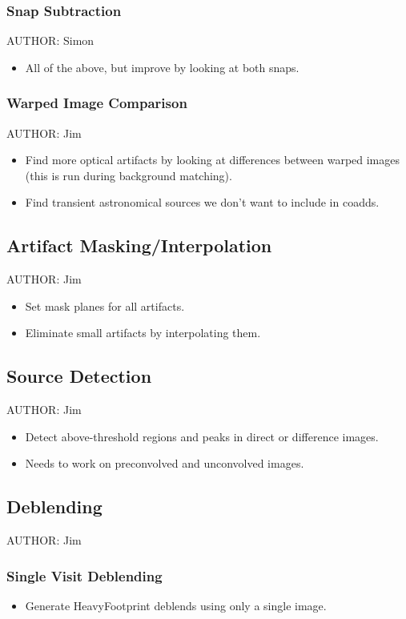 \subsubsection{Snap Subtraction}
AUTHOR: Simon
\begin{itemize}
\item All of the above, but improve by looking at both snaps.
\end{itemize}

\subsubsection{Warped Image Comparison}
AUTHOR: Jim
\begin{itemize}
\item Find more optical artifacts by looking at differences between warped images (this is run during background matching).
\item Find transient astronomical sources we don't want to include in coadds.
\end{itemize}

\subsection{Artifact Masking/Interpolation}
AUTHOR: Jim
\begin{itemize}
\item Set mask planes for all artifacts.
\item Eliminate small artifacts by interpolating them.
\end{itemize}

\subsection{Source Detection}
AUTHOR: Jim
\begin{itemize}
\item Detect above-threshold regions and peaks in direct or difference images.
\item Needs to work on preconvolved and unconvolved images.
\end{itemize}

\subsection{Deblending}
AUTHOR: Jim
\subsubsection{Single Visit Deblending}
\begin{itemize}
\item Generate HeavyFootprint deblends using only a single image.
\end{itemize}
